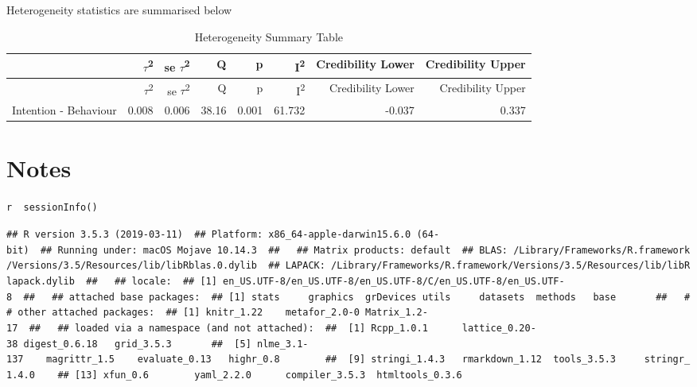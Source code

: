 \documentclass[]{article}
\begin{document}
Heterogeneity statistics are summarised below

\begin{longtable}[]{@{}lrrrrrrr@{}}
\caption{Heterogeneity Summary Table}\tabularnewline
\toprule
& \(\tau\)\textsuperscript{2} & se \(\tau\)\textsuperscript{2} & Q & p &
I\textsuperscript{2} & Credibility Lower & Credibility
Upper\tabularnewline
\midrule
\endfirsthead
\toprule
& \(\tau\)\textsuperscript{2} & se \(\tau\)\textsuperscript{2} & Q & p &
I\textsuperscript{2} & Credibility Lower & Credibility
Upper\tabularnewline
\midrule
\endhead
Intention - Behaviour & 0.008 & 0.006 & 38.16 & 0.001 & 61.732 & -0.037
& 0.337\tabularnewline
\bottomrule
\end{longtable}

\newpage

\section{Notes}\label{notes}

\texttt{r\ \ sessionInfo()}

\texttt{\#\#\ R\ version\ 3.5.3\ (2019-03-11)\ \ \#\#\ Platform:\ x86\_64-apple-darwin15.6.0\ (64-bit)\ \ \#\#\ Running\ under:\ macOS\ Mojave\ 10.14.3\ \ \#\#\ \ \ \#\#\ Matrix\ products:\ default\ \ \#\#\ BLAS:\ /Library/Frameworks/R.framework/Versions/3.5/Resources/lib/libRblas.0.dylib\ \ \#\#\ LAPACK:\ /Library/Frameworks/R.framework/Versions/3.5/Resources/lib/libRlapack.dylib\ \ \#\#\ \ \ \#\#\ locale:\ \ \#\#\ {[}1{]}\ en\_US.UTF-8/en\_US.UTF-8/en\_US.UTF-8/C/en\_US.UTF-8/en\_US.UTF-8\ \ \#\#\ \ \ \#\#\ attached\ base\ packages:\ \ \#\#\ {[}1{]}\ stats\ \ \ \ \ graphics\ \ grDevices\ utils\ \ \ \ \ datasets\ \ methods\ \ \ base\ \ \ \ \ \ \ \#\#\ \ \ \#\#\ other\ attached\ packages:\ \ \#\#\ {[}1{]}\ knitr\_1.22\ \ \ \ metafor\_2.0-0\ Matrix\_1.2-17\ \ \#\#\ \ \ \#\#\ loaded\ via\ a\ namespace\ (and\ not\ attached):\ \ \#\#\ \ {[}1{]}\ Rcpp\_1.0.1\ \ \ \ \ \ lattice\_0.20-38\ digest\_0.6.18\ \ \ grid\_3.5.3\ \ \ \ \ \ \ \#\#\ \ {[}5{]}\ nlme\_3.1-137\ \ \ \ magrittr\_1.5\ \ \ \ evaluate\_0.13\ \ \ highr\_0.8\ \ \ \ \ \ \ \ \#\#\ \ {[}9{]}\ stringi\_1.4.3\ \ \ rmarkdown\_1.12\ \ tools\_3.5.3\ \ \ \ \ stringr\_1.4.0\ \ \ \ \#\#\ {[}13{]}\ xfun\_0.6\ \ \ \ \ \ \ \ yaml\_2.2.0\ \ \ \ \ \ compiler\_3.5.3\ \ htmltools\_0.3.6}
\end{document}
